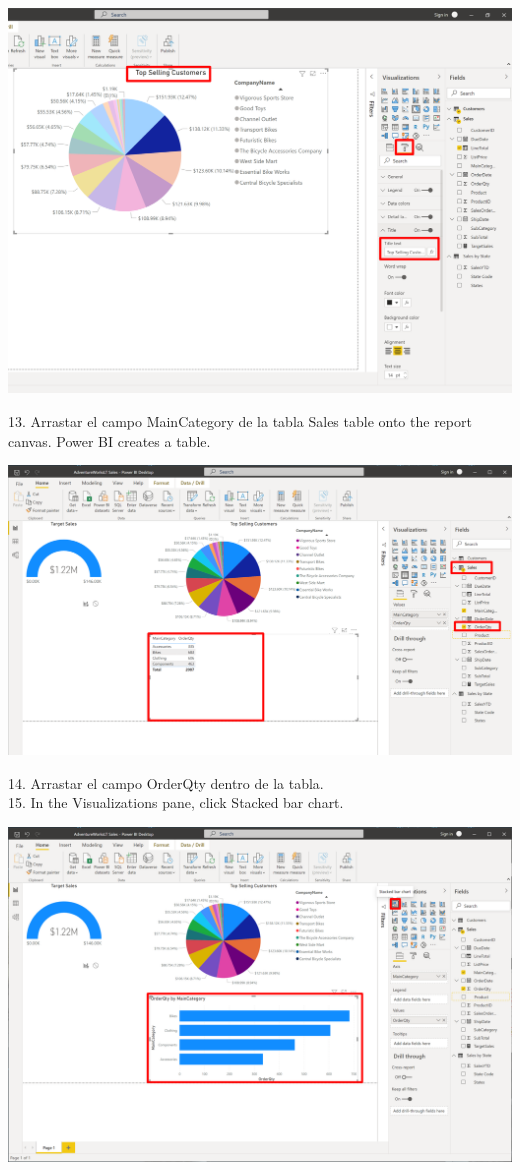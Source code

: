 \documentclass[12pt,letterpaper]{article}
\begin{document}
\begin{center}
    \includegraphics[width=15cm]{img/82.png}
\end{center}
13. Arrastar el campo MainCategory de la tabla Sales table onto the report canvas. Power BI creates a table.
\begin{center}
    \includegraphics[width=16cm]{img/84.png}
\end{center}
14. Arrastar el campo OrderQty dentro de la tabla.
\\15. In the Visualizations pane, click Stacked bar chart.
\begin{center}
    \includegraphics[width=15cm]{img/85.png}
\end{center}
\end{document}
